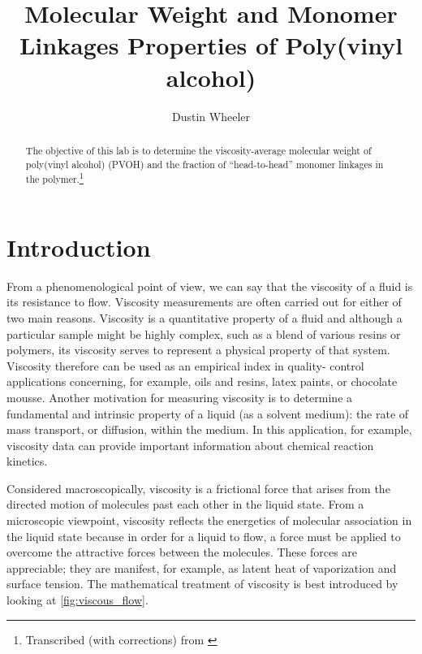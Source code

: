 \documentclass[nobib,nofonts,nols,nohyper]{tufte-handout}
\title{Molecular Weight and Monomer Linkages Properties of Poly(vinyl alcohol)}
\author{Dustin Wheeler}
\begin{document}
\maketitle%

\begin{abstract}
\noindent
The objective of this lab is to determine the viscosity-average molecular weight of poly(vinyl alcohol) (PVOH) and the fraction of ``head-to-head'' monomer linkages in the polymer.\thanks{Transcribed (with corrections) from \cite{halpern97}} %
\end{abstract}

\section{Introduction} %
\label{sec:intro}

From a phenomenological point of view, we can say that the viscosity of a fluid is its resistance to flow. 
Viscosity measurements are often carried out for either of two main reasons. 
Viscosity is a quantitative property of a fluid and although a particular sample might be highly complex, such as a blend of various resins or polymers, its viscosity serves to represent a physical property of that system. 
Viscosity therefore can be used as an empirical index in quality- control applications concerning, for example, oils and resins, latex paints, or chocolate mousse. 
Another motivation for measuring viscosity is to determine a fundamental and intrinsic property of a liquid (as a solvent medium): the rate of mass transport, or diffusion, within the medium. 
In this application, for example, viscosity data can provide important information about chemical reaction kinetics. 

Considered macroscopically, viscosity is a frictional force that arises from the directed motion of molecules past each other in the liquid state. 
From a microscopic viewpoint, viscosity reflects the energetics of molecular association in the liquid state because in order for a liquid to flow, a force must be applied to overcome the attractive forces between the molecules. 
These forces are appreciable; they are manifest, for example, as latent heat of vaporization and surface tension. 
The mathematical treatment of viscosity is best introduced by looking at \cref{fig:viscous_flow}.
\end{document}
